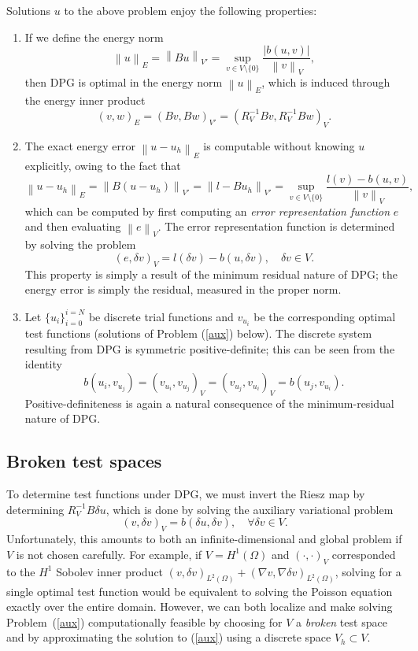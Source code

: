 \documentclass[11pt,onecolumn]{scrartcl}
\newcommand{\nor}[1]{\left\| #1 \right\|}
\newcommand{\LRp}[1]{\left( #1 \right)}
\newcommand{\LRb}[1]{\left| #1 \right|}
\newcommand{\grad}{\nabla}
\begin{document}
Solutions $u$ to the above problem enjoy the following properties: 
\begin{enumerate}
\item If we define the energy norm 
\[
\nor{u}_E = \nor{Bu}_{V'} = \sup_{v\in V\setminus\{0\}}\frac{\LRb{b(u,v)}}{\nor{v}_V},
\]
then DPG is optimal in the energy norm $\nor{u}_E$, which is induced through the energy inner product
\[
\LRp{v,w}_E = \LRp{Bv,Bw}_{V'} = \LRp{R_V^{-1}Bv, R_V^{-1}Bw}_V.
\]
\item The exact energy error $\nor{u-u_h}_E$ is computable without knowing $u$ explicitly, owing to the fact that
\[
\nor{u-u_h}_E = \nor{B(u-u_h)}_{V'} = \nor{{l-Bu_h}}_{V'} = \sup_{v\in V\setminus\{0\}}\frac{l(v)-b(u,v)}{\nor{v}_V},
\]
which can be computed by first computing an \textit{error representation function} $e$ and then evaluating $\nor{e}_V$.  The error representation function is determined by solving the problem
\[
\LRp{e,\delta v}_V = l(\delta v)-b(u,\delta v), \quad \delta v\in V.
\]
This property is simply a result of the minimum residual nature of DPG; the energy error is simply the residual, measured in the proper norm.  
\item Let $\{u_i\}_{i = 0}^{i = N}$ be discrete trial functions and $v_{u_i}$ be the corresponding optimal test functions (solutions of Problem (\ref{aux}) below).  The discrete system resulting from DPG is symmetric positive-definite; this can be seen from the identity
\[
b(u_i,v_{u_j}) = \LRp{v_{u_i},v_{u_j}}_V = \LRp{v_{u_j},v_{u_i}}_V = b(u_j,v_{u_i}).
\]
Positive-definiteness is again a natural consequence of the minimum-residual nature of DPG.  
\end{enumerate}

\subsection{Broken test spaces}

To determine test functions under DPG, we must invert the Riesz map by determining $R_V^{-1} B\delta u$, which is done by solving the auxiliary variational problem
\begin{equation}
\label{aux}
(v,\delta v)_V = b\LRp{\delta u,\delta v}, \quad \forall \delta v\in V.  
\end{equation}
Unfortunately, this amounts to both an infinite-dimensional and global problem if $V$ is not chosen carefully.  For example, if $V = H^1(\Omega)$ and $\LRp{\cdot, \cdot }_V$ corresponded to the $H^1$ Sobolev inner product  $\LRp{v,\delta v}_{L^2(\Omega)} + \LRp{\grad v,\grad \delta v}_{L^2(\Omega)}$, solving for a single optimal test function would be equivalent to solving the Poisson equation exactly over the entire domain.  However, we can both localize and make solving Problem~(\ref{aux}) computationally feasible by choosing for $V$ a \textit{broken} test space and by approximating the solution to (\ref{aux}) using a discrete space $V_h\subset V$.
\end{document}
